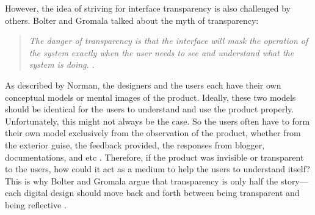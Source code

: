 \documentclass{acm_proc_article-sp}
\begin{document}
However, the idea of striving for interface transparency is also
challenged by others. Bolter and Gromala talked about the myth of
transparency:
\begin{quote}
\textit{The danger of transparency is that the interface will mask the
operation of the system exactly when the user needs to see and
understand what the system is doing.} \cite{windows:bolter}.
\end{quote}
As described by Norman, the designers and the users each have their
own conceptual models or mental images of the product. Ideally, these
two models should be identical for the users to understand and use the
product properly. Unfortunately, this might not always be the case. So
the users often have to form their own model exclusively from the
observation of the product, whether from the exterior guise, the
feedback provided, the responses from blogger, documentations, and etc
\cite{design:norman}. Therefore, if the product was invisible or
transparent to the users, how could it act as a medium to help the
users to understand itself? This is why Bolter and Gromala argue that
transparency is only half the story---each digital design should move
back and forth between being transparent and being reflective
\cite{windows:bolter}.
\end{document}
